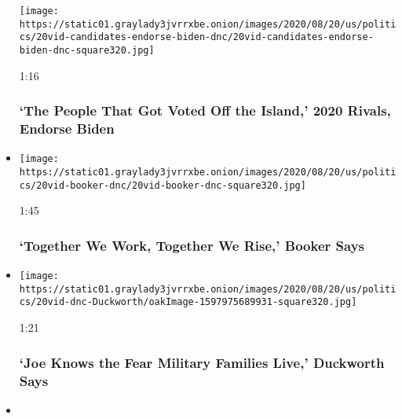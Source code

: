 \begin{itemize}
  \texttt{[image: https://static01.graylady3jvrrxbe.onion/images/2020/08/20/us/politics/20vid-candidates-endorse-biden-dnc/20vid-candidates-endorse-biden-dnc-square320.jpg]}

  1:16

  \hypertarget{the-people-that-got-voted-off-the-island-2020-rivals-endorse-biden}{%
  \subsubsection{`The People That Got Voted Off the Island,' 2020
  Rivals, Endorse
  Biden}\label{the-people-that-got-voted-off-the-island-2020-rivals-endorse-biden}}
\item
  \href{https://www.nytimes3xbfgragh.onion/video/us/elections/100000007299801/cory-booker-speaks-dnc.html?action=click\&module=video-series-bar\&region=header\&pgtype=Article\&playlistId=video/2020-Elections}{}

  \texttt{[image: https://static01.graylady3jvrrxbe.onion/images/2020/08/20/us/politics/20vid-booker-dnc/20vid-booker-dnc-square320.jpg]}

  1:45

  \hypertarget{together-we-work-together-we-rise-booker-says}{%
  \subsubsection{`Together We Work, Together We Rise,' Booker
  Says}\label{together-we-work-together-we-rise-booker-says}}
\item
  \href{https://www.nytimes3xbfgragh.onion/video/us/elections/100000007299848/tammy-duckworth-speaks-dnc.html?action=click\&module=video-series-bar\&region=header\&pgtype=Article\&playlistId=video/2020-Elections}{}

  \texttt{[image: https://static01.graylady3jvrrxbe.onion/images/2020/08/20/us/politics/20vid-dnc-Duckworth/oakImage-1597975689931-square320.jpg]}

  1:21

  \hypertarget{joe-knows-the-fear-military-families-live-duckworth-says}{%
  \subsubsection{`Joe Knows the Fear Military Families Live,' Duckworth
  Says}\label{joe-knows-the-fear-military-families-live-duckworth-says}}
\item
  \href{https://www.nytimes3xbfgragh.onion/video/us/elections/100000007299756/deb-haaland-speaks-dnc.html?action=click\&module=video-series-bar\&region=header\&pgtype=Article\&playlistId=video/2020-Elections}{}


\end{itemize}
